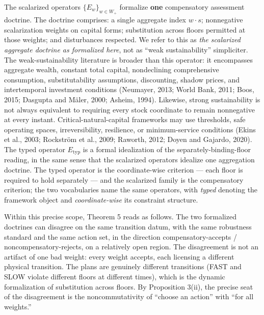 \documentclass[3p,11pt]{elsarticle}
\begin{document}
The scalarized operators \(\{E_w\}_{w \in W_+}\) formalize \textbf{one}
compensatory assessment doctrine. The doctrine comprises: a single
aggregate index \(w \cdot s\); nonnegative scalarization weights on
capital forms; substitution across floors permitted at those weights;
and disturbances respected. We refer to this as \emph{the scalarized
aggregate doctrine as formalized here}, not as ``weak sustainability''
simpliciter. The weak-sustainability literature is broader than this
operator: it encompasses aggregate wealth, constant total capital,
nondeclining comprehensive consumption, substitutability assumptions,
discounting, shadow prices, and intertemporal investment conditions
(Neumayer, 2013; World Bank, 2011; Boos, 2015; Dasgupta and M\"aler, 2000;
Asheim, 1994). Likewise, strong sustainability is not always equivalent
to requiring every stock coordinate to remain nonnegative at every
instant. Critical-natural-capital frameworks may use thresholds, safe
operating spaces, irreversibility, resilience, or minimum-service
conditions (Ekins et al., 2003; Rockstr\"om et al., 2009; Raworth, 2012;
Doyen and Gajardo, 2020). The typed
operator \(E_{\mathrm{typ}}\) is a formal idealization of the
separately-binding-floor reading, in the same sense that the scalarized
operators idealize one aggregation doctrine. The typed operator is the
coordinate-wise criterion --- each floor is required to hold separately ---
and the scalarized family is the compensatory criterion; the two vocabularies
name the same operators, with \emph{typed} denoting the framework object and
\emph{coordinate-wise} its constraint structure.

Within this precise scope, Theorem 5 reads as follows. The two
formalized doctrines can disagree on the same transition datum, with the
same robustness standard and the same action set, in the direction
compensatory-accepts / noncompensatory-rejects, on a relatively open
region. The disagreement is not an artifact of one bad weight: every
weight accepts, each licensing a different physical transition. The
plans are genuinely different transitions (FAST and SLOW violate
different floors at different times), which is the dynamic formalization
of substitution across floors. By Proposition 3(ii), the precise seat of
the disagreement is the noncommutativity of ``choose an action'' with
``for all weights.''
\end{document}
